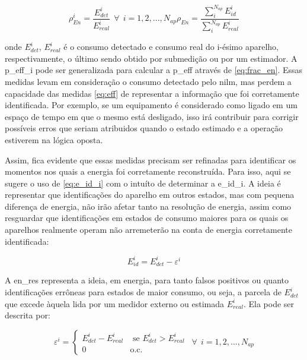 \begin{subequations}
\begin{equation}\label{eq:frac_en_app}
\rho_{En}^i = \frac{E_{det}^i}{E_{real}^i} ~~ \forall ~~ 
i = 1,2,...,N_{ap}
\end{equation}
\begin{equation}\label{eq:frac_en}
\rho_{En} = \frac{\sum_{i}^{N_{ap}}E_{id}^i}{\sum_{i}^{N_{ap}}E_{real}^i} 
\end{equation}
\end{subequations}

\noindent onde $E_{det}^i$, $E_{real}^i$ é o consumo detectado e
consumo real do i-ésimo aparelho, respectivamente, o último sendo
obtido por submedição ou por um estimador. A \gls{p_eff_i}
pode ser generalizada para calcular a \gls{p_eff} através de
\ref{eq:frac_en}.  Essas medidas levam em consideração o consumo
detectado pelo \gls{nilm}, mas perdem a capacidade das medidas 
\ref{eq:eff} de representar a informação que foi corretamente
identificada. Por exemplo, se um equipamento é considerado como ligado
em um espaço de tempo em que o mesmo está desligado, isso irá
contribuir para corrigir possíveis erros que seriam atribuidos quando
o estado estimado e a operação estiverem na lógica oposta.

Assim, fica evidente que essas medidas precisam ser refinadas para
identificar os momentos nos quais a energia foi corretamente
reconstruída. Para isso, aqui se sugere o uso de \ref{eq:e_id_i} com
o intuíto de determinar a \gls{e_id_i}. A ideia
é representar que identificações do aparelho em outros estados, mas
com pequena diferença de energia, não irão afetar tanto na resolução
de energia, assim como resguardar que identificações em estados de
consumo maiores para os quais os aparelhos realmente operam não
arremeterão na conta de energia corretamente identificada:

\begin{equation}\label{eq:e_id_i}
E_{id}^i = E_{det}^i-\varepsilon^i
\end{equation}

A \gls{en_res} representa a ideia, em energia, para tanto falsos
positivos ou quanto identificações errôneas para estados de maior
consumo, ou seja, a parcela de $E_{det}^i$ que excede àquela lida por
um medidor externo ou estimada $E_{real}^i$. Ela pode ser descrita
por:

\begin{equation}\label{eq:en_res}
\varepsilon^i = \left\{\begin{array}{rl}
 E_{det}^i - E_{real}^i &\mbox{ se $E_{det}^i>E_{real}^i$} \\
 0 &\mbox{o.c.}
\end{array} \right. ~~ \forall ~~ i = 1,2,...,N_{ap}
\end{equation}

